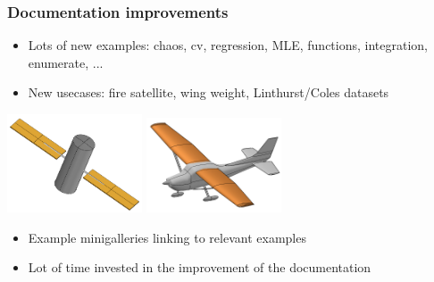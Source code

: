 \documentclass[aspectratio=169]{beamer}
\begin{document}
\begin{frame}
\frametitle{Documentation improvements}
\begin{itemize}
\item Lots of new examples: chaos, cv, regression, MLE, functions, integration, enumerate, ...
\item New usecases: fire satellite, wing weight, Linthurst/Coles datasets
\end{itemize}

\begin{center}
\includegraphics[width=0.3\textwidth]{figures/firesatellite}
\includegraphics[width=0.3\textwidth]{figures/wingweight}
\end{center}

\begin{itemize}
\item Example minigalleries linking to relevant examples
\item Lot of time invested in the improvement of the documentation
\end{itemize}
\end{frame}

\end{document}
